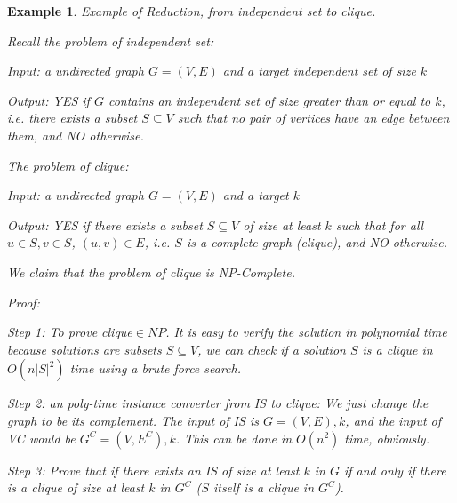 \documentclass[twoside]{article}
\newtheorem{protoexample}[prototheorem]{Example}
\newenvironment{example}
{\colorlet{shadecolor}{red!15}\begin{shaded}\begin{protoexample}\normalfont}
		{\end{protoexample}\end{shaded}}
\begin{document}
\begin{example}
	Example of Reduction, from independent set to clique. 
		
	Recall the problem of independent set: 
		
	Input: a undirected graph $G = (V, E)$ and a target independent set of size $k$
		
	Output: YES if $G$ contains an independent set of size greater than or equal to $k$, i.e. there exists a subset $S \subseteq V$ such that no pair of vertices have an edge between them, and NO otherwise. 
		
	The problem of clique: 
		
	Input: a undirected graph $G = (V, E)$ and a target $k$
		
	Output: YES if there exists a subset $S \subseteq V$ of size at least $k$ such that for all $u \in S, v \in S$, $(u, v) \in E$, i.e. $S$ is a complete graph (clique), and NO otherwise. 
		
	We claim that the problem of clique is NP-Complete. 
		
	Proof: 
		
	Step 1: To prove clique$ \in NP$. It is easy to verify the solution in polynomial time because solutions are subsets $S \subseteq V$, we can check if a solution $S$ is a clique in $O(n|S|^2)$ time using a brute force search. 
		
	Step 2: an poly-time instance converter from IS to clique: We just change the graph to be its complement. The input of IS is $G=(V, E), k$, and the input of VC would be $G^C=(V, E^C), k$. This can be done in $O(n^2)$ time, obviously. 
		
	Step 3: Prove that if there exists an IS of size at least $k$ in $G$ if and only if there is a clique of size at least $k$ in $G^C$ ($S$ itself is a clique in $G^C$). 
\end{example}
\end{document}
